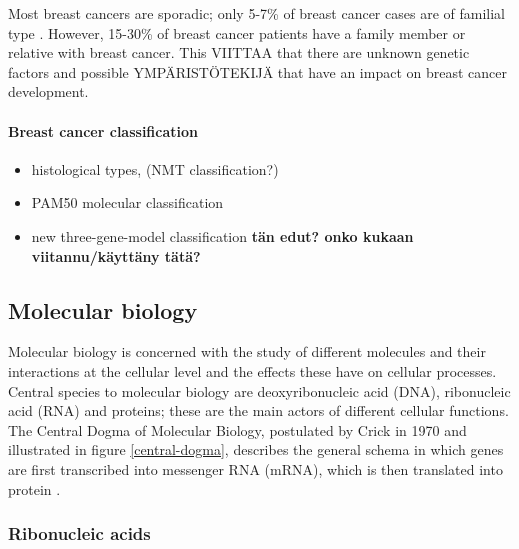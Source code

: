 Most breast cancers are sporadic; only 5-7\% of breast cancer cases are of
familial type \citep{Melchor2013}. However, 15-30\% of breast cancer patients
have a family member or relative with breast cancer. This VIITTAA that there
are unknown genetic factors and possible YMPÄRISTÖTEKIJÄ that have an impact
on breast cancer development.


\paragraph{Breast cancer classification}\label{breast-cancer-classification}

\begin{itemize}
\tightlist
\item
  histological types, (NMT classification?)
\item
  PAM50 molecular classification
\item
  new three-gene-model classification \textbf{tän edut? onko kukaan viitannu/käyttäny tätä?}
\end{itemize}









\subsection{Molecular biology}\label{molecular-biology}

Molecular biology is concerned with the study of different molecules and their
interactions at the cellular level and the effects these have on cellular
processes. Central species to molecular biology are deoxyribonucleic acid
(DNA), ribonucleic acid (RNA) and proteins; these are the main actors of
different cellular functions. The Central Dogma of Molecular Biology,
postulated by Crick in 1970 and illustrated in figure \ref{central-dogma},
describes the general schema in which genes are first transcribed into
messenger RNA (mRNA), which is then translated into protein
\citep{Crick1970}.

\subsubsection{Ribonucleic acids}\label{ribonucleic-acids}










